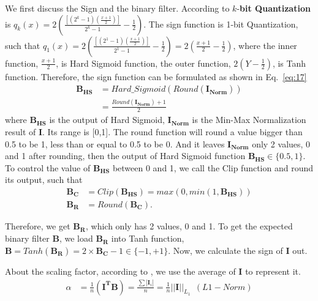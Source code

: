 \documentclass[sn-mathphys,iicol,Numbered]{sn-jnl}
\begin{document}
\begin{appendices}
We first discuss the Sign and the binary filter. According to \citep{A2_xnor} $k$-\textbf{bit Quantization} is $q_{k}(x)=2(\frac{[(2^{k}-1)(\frac{x+1}{2})]}{2^{k}-1} - \frac{1}{2})$. The sign function is 1-bit Quantization, such that $q_{1}(x)=2(\frac{[(2^{1}-1)(\frac{x+1}{2})]}{2^{1}-1} - \frac{1}{2})=2(\frac{x+1}{2}-\frac{1}{2})$, where the inner function, $\frac{x+1}{2}$, is Hard Sigmoid function, the outer function, $2(Y-\frac{1}{2})$, is Tanh function. Therefore, the sign function can be formulated as shown in Eq.~\ref{eq:17}
\vspace{-0.2cm}
\begin{equation} \label{eq:17}
\begin{split}
\mathbf{B}_{\mathbf{HS}} &= Hard\_Sigmoid(Round(\mathbf{I_{Norm}})) \\
 &= \frac{Round(\mathbf{I_{Norm}}) + 1}{2}
\end{split}
\end{equation}
where $\mathbf{B_{HS}}$ is the output of Hard Sigmoid, $\mathbf{I_{Norm}}$ is the Min-Max Normalization result of $\mathbf{I}$. Its range is [0,1]. The round function will round a value bigger than 0.5 to be 1, less than or equal to 0.5 to be 0. And it leaves $\mathbf{I_{Norm}}$ only 2 values, 0 and 1 after rounding, then the output of Hard Sigmoid function $\mathbf{B}_{\mathbf{HS}}\in\{0.5,1\}$. To control the value of $\mathbf{B}_{\mathbf{HS}}$ between 0 and 1, we call the Clip function and round its output, such that
\vspace{-0.2cm}
\begin{align} \label{eq:18}
\mathbf{B}_{\mathbf{C}} &= Clip(\mathbf{B}_{\mathbf{HS}}) = max(0, min(1, \mathbf{B}_{\mathbf{HS}})) \\
\mathbf{B}_{\mathbf{R}} &= Round(\mathbf{B}_{\mathbf{C}}).
\end{align}
\vspace{-0.3cm}

Therefore, we get $\mathbf{B}_{\mathbf{R}}$, which only has 2 values, 0 and 1. To get the expected binary filter $\mathbf{B}$, we load $\mathbf{B}_{\mathbf{R}}$ into Tanh function, $\mathbf{B} = Tanh(\mathbf{B}_{\mathbf{R}}) = 2\times \mathbf{B}_{\mathbf{C}} -1\in\{-1,+1\}$. Now, we calculate the sign of $\mathbf{I}$ out.

About the scaling factor, according to \cite{A2_xnor}, we use the average of $\mathbf{I}$ to represent it.
\vspace{-0.2cm}
\begin{equation} \label{eq:19}
\begin{split}
\alpha &= \frac{1}{n}(\mathbf{I}^{\mathbf{T}}\mathbf{B}) = \frac{\sum |\mathbf{I}_{i}|}{n} = \frac{1}{n}||\mathbf{I}||_{L_{1}}\ \ (L1-Norm)
\end{split}
\end{equation}
\vspace{-0.3cm}


\end{appendices}
\end{document}
